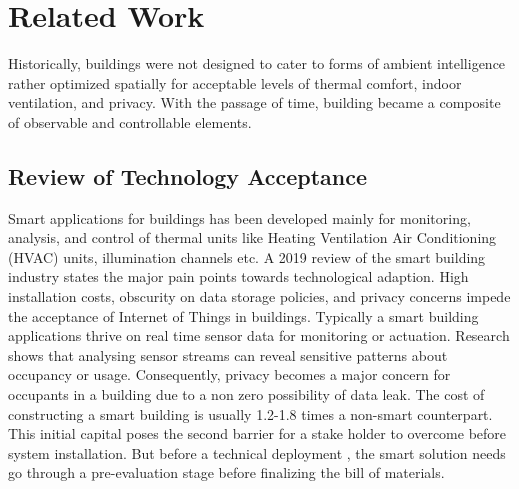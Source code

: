 \section{Related Work}
\label{sec: relatedworks}


Historically, buildings were not designed to cater to forms of ambient intelligence rather optimized spatially for acceptable levels of thermal comfort, indoor ventilation, and privacy.
With the passage of time, building became a composite of observable and controllable elements.





\subsection{Review of Technology Acceptance}


 
 Smart applications \cite{wong2005intelligent} for buildings has been developed mainly for monitoring, analysis, and control of thermal units like Heating Ventilation Air Conditioning (HVAC) units, illumination channels etc.
 A 2019 review \cite{jia2019adopting} of the smart building industry states the major pain points towards technological adaption.
 High installation costs, obscurity on data storage policies, and privacy concerns impede the acceptance \cite{hojjati2016evaluation} of Internet of Things in buildings.
Typically a smart building applications thrive on real time sensor data for monitoring or actuation.
Research shows that analysing sensor streams can reveal sensitive patterns about occupancy \cite{garg2000smart} or usage.
Consequently, privacy becomes a major concern for occupants in a building due to a non zero possibility of data leak. 
The cost  of constructing \cite{ma2017business} a smart building is usually 1.2-1.8 times a non-smart counterpart.
This initial capital poses the second barrier for a stake holder \cite{xu2019platform} to overcome before system installation.
But before a technical deployment \cite{ma2016market}, the smart solution needs go through a pre-evaluation stage before finalizing the bill of materials.

